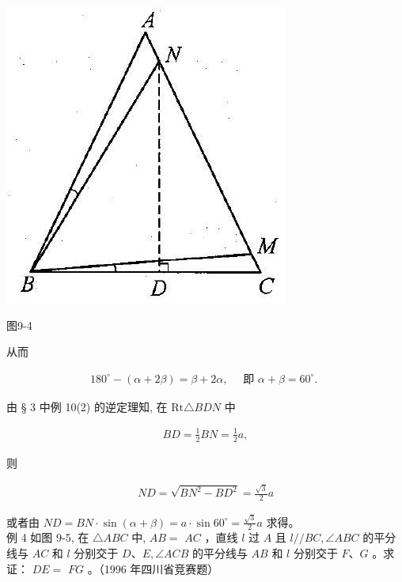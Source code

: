 \documentclass[10pt]{article}
\begin{document}
\begin{center}
\includegraphics[max width=\textwidth]{2024_10_30_2c8f45efd4a519b08e1ag-091}
\end{center}

图9-4

从而

\begin{align*}
180^{\circ}-(\alpha+2 \beta)=\beta+2 \alpha, \quad \text { 即 } \alpha+\beta=60^{\circ} \text {. }
\end{align*}

由 § 3 中例 10(2) 的逆定理知, 在 $\mathrm{Rt} \triangle B D N$ 中

\begin{align*}
B D=\frac{1}{2} B N=\frac{1}{2} a,
\end{align*}

则

\begin{align*}
N D=\sqrt{B N^{2}-B D^{2}}=\frac{\sqrt{3}}{2} a
\end{align*}

或者由 $N D=B N \cdot \sin (\alpha+\beta)=a \cdot \sin 60^{\circ}=\frac{\sqrt{3}}{2} a$ 求得。\\
例 4 如图 9-5, 在 $\triangle A B C$ 中, $A B=$ $A C$ ，直线 $l$ 过 $A$ 且 $l / / B C, \angle A B C$ 的平分线与 $A C$ 和 $l$ 分别交于 $D 、 E, \angle A C B$ 的平分线与 $A B$ 和 $l$ 分别交于 $F 、 G$ 。求证： $D E=$ $F G$ 。（1996 年四川省竞赛题）
\end{document}
